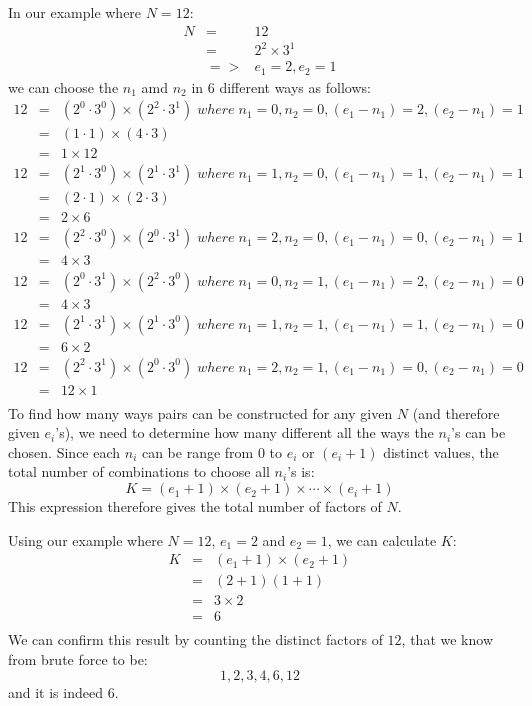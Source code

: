 \documentclass{article}
\begin{document}
In our example where $N =12$:
\begin{eqnarray*}
N & = & 12\\
& = & 2 ^ 2 \times 3 ^ 1 \\
& => & e_1 = 2, e_2 = 1
\end{eqnarray*}
we can choose the $n_1$ amd $n_2$ in 6 different ways as follows:
\begin{eqnarray*}
12 &=& (2^0 \cdot 3^0) \times (2^2 \cdot 3^1) \; where \; n_1 = 0, n_2 = 0, (e_1-n_1) = 2, (e_2-n_1) = 1 \\
   &=& (1 \cdot 1) \times (4 \cdot 3) \\
   &=& 1 \times 12 \\
12 &=& (2^1 \cdot 3^0) \times (2^1 \cdot 3^1) \; where \; n_1 = 1, n_2 = 0, (e_1-n_1) = 1, (e_2-n_1) = 1\\
   &=& (2 \cdot 1) \times (2 \cdot 3) \\
   &=& 2 \times 6 \\
12 &=& (2^2 \cdot 3^0) \times (2^0 \cdot 3^1) \; where \; n_1 = 2, n_2 = 0, (e_1-n_1) = 0, (e_2-n_1) = 1\\
   &=& 4 \times 3 \\
12 &=& (2^0 \cdot 3^1) \times (2^2 \cdot 3^0) \; where \; n_1 = 0, n_2 = 1, (e_1-n_1) = 2, (e_2-n_1) = 0 \\
   &=& 4 \times 3  \\
12 &=& (2^1 \cdot 3^1) \times (2^1 \cdot 3^0) \; where \; n_1 = 1, n_2 = 1, (e_1-n_1) = 1, (e_2-n_1) = 0\\
   &=& 6 \times 2  \\
12 &=& (2^2 \cdot 3^1) \times (2^0 \cdot 3^0) \; where \; n_1 = 2, n_2 = 1, (e_1-n_1) = 0, (e_2-n_1) = 0\\
   &=& 12 \times 1 \\
\end{eqnarray*}
To find how many ways pairs can be constructed for any given $N$ (and therefore given $e_i$'s), we need to determine how many different all the ways the $n_i$'s can be chosen. 
Since each $n_i$ can be range from $0$ to $e_i$ or $(e_i + 1)$ distinct values, the total number of combinations to choose all $n_i$'s is:
$$
K = (e_1 +1) \times (e_2 + 1) \times \cdots \times (e_i + 1)
$$
This expression therefore gives the total number of factors of $N$.

Using our example where $N = 12$, $e_1 = 2$ and $e_2 = 1$, we can calculate $K$:
\begin{eqnarray*}
K & = & (e_1 +1) \times (e_2 + 1) \\
  & = & (2 + 1) ( 1 + 1) \\
  & = & 3 \times 2 \\
  & = & 6 \\
\end{eqnarray*}
We can confirm this result by counting the distinct factors of $12$, that we know from brute force to be:
$$
1, 2, 3, 4, 6, 12
$$
and it is indeed 6.
\end{document}
